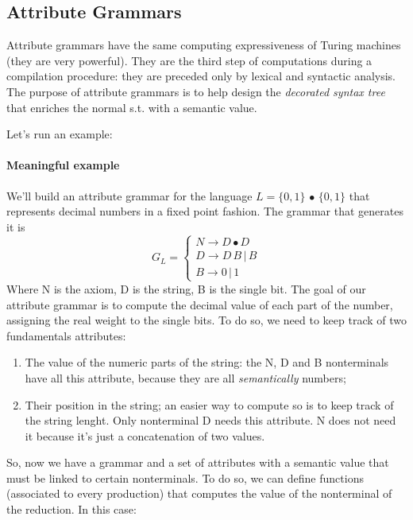 		\subsection{Attribute Grammars}
			Attribute grammars have the same computing expressiveness of Turing machines (they are very powerful). They are the third step of computations during a 
			compilation procedure: they are preceded only by lexical and syntactic analysis. The purpose of attribute grammars is to help design the 
			\emph{decorated syntax tree} that enriches the normal s.t. with a semantic value.

			Let's run an example:
			
			\paragraph{Meaningful example}
				We'll build an attribute grammar for the language $L = \{0, 1\} \,\bullet\, \{0, 1\}$ that represents decimal numbers in a fixed point fashion. The 
				grammar that generates it is
				\begin{equation}
					G_L = 
					\begin{cases}
						N \rightarrow D \bullet D \\
						D \rightarrow D \, B \, \vert \, B \\
						B \rightarrow 0 \, \vert \, 1
					\end{cases}
				\end{equation}
				Where N is the axiom, D is the string, B is the single bit. The goal of our attribute grammar is to compute the decimal value of each part of the 
				number, assigning the real weight to the single bits. To do so, we need to keep track of two fundamentals attributes:
				\begin{enumerate}
					\item The value of the numeric parts of the string: the N, D and B nonterminals have all this attribute, because they are all \emph{semantically} 
					numbers;
					\item Their position in the string; an easier way to compute so is to keep track of the string lenght. Only nonterminal D needs this attribute. 
					N does not need it because it's just a concatenation of two values. 
				\end{enumerate}
				So, now we have a grammar and a set of attributes with a semantic value that must be linked to certain nonterminals. To do so, we can define 
				functions (associated to every production) that computes the value of the nonterminal of the reduction. In this case:

